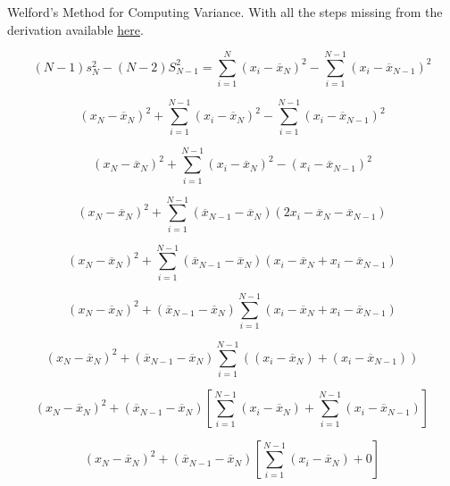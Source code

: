\documentclass{article}
\newcommand*\mean[1]{\overline{#1}}
\begin{document}
\begin{center}
Welford's Method for Computing Variance. With all the steps missing from the derivation available \href{https://jonisalonen.com/2013/deriving-welfords-method-for-computing-variance/}{here}.
\end{center}

\begin{equation}
    (N - 1)s_N^2 - (N-2)S_{N-1}^2 = \sum_{i=1}^{N} (x_i - \mean{x}_N)^2 - \sum_{i=1}^{N-1} (x_i - \mean{x}_{N-1})^2
\end{equation}

\begin{equation}
     (x_N - \mean{x}_N)^2 + \sum_{i=1}^{N-1} (x_i - \mean{x}_N)^2 - \sum_{i=1}^{N-1} (x_i - \mean{x}_{N-1})^2
\end{equation}

\begin{equation}
     (x_N - \mean{x}_N)^2 + \sum_{i=1}^{N-1} (x_i - \mean{x}_N)^2 - (x_i - \mean{x}_{N-1})^2
\end{equation}



\begin{equation}
     (x_N - \mean{x}_N)^2 + \sum_{i=1}^{N-1} (\mean{x}_{N-1} - \mean{x}_N)(2x_i - \mean{x}_N - \mean{x}_{N-1})
\end{equation}
 
\begin{equation}
     (x_N - \mean{x}_N)^2 + \sum_{i=1}^{N-1} (\mean{x}_{N-1} - \mean{x}_N)(x_i - \mean{x}_N + x_i - \mean{x}_{N-1})
\end{equation}

 
\begin{equation}
     (x_N - \mean{x}_N)^2 + (\mean{x}_{N-1} - \mean{x}_N)\sum_{i=1}^{N-1} (x_i - \mean{x}_N + x_i - \mean{x}_{N-1})
\end{equation}

\begin{equation}
     (x_N - \mean{x}_N)^2 + (\mean{x}_{N-1} - \mean{x}_N)\sum_{i=1}^{N-1}( (x_i - \mean{x}_N) + (x_i - \mean{x}_{N-1}))
\end{equation}

\begin{equation}
     (x_N - \mean{x}_N)^2 + (\mean{x}_{N-1} - \mean{x}_N)[\sum_{i=1}^{N-1} (x_i - \mean{x}_N) + \sum_{i=1}^{N-1}(x_i - \mean{x}_{N-1})]
\end{equation}

\begin{equation}
     (x_N - \mean{x}_N)^2 + (\mean{x}_{N-1} - \mean{x}_N)[\sum_{i=1}^{N-1} (x_i - \mean{x}_N) + 0]
\end{equation}
\end{document}

